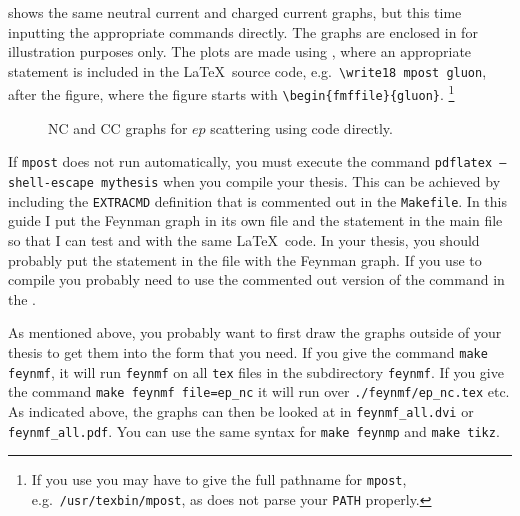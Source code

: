 shows the same neutral current and
charged current graphs, but this time inputting the appropriate
 commands directly. The graphs are enclosed in
 for illustration purposes only.
The plots are made using ,
where an appropriate
 statement is included in the \LaTeX\ source code,
e.g.\ \verb+\write18 mpost gluon+, after the figure, where the figure
starts with \verb+\begin{fmffile}{gluon}+.%
\footnote{If you use \TeXstudio you may have to give the full pathname for \texttt{mpost},
  e.g.\ \texttt{/usr/texbin/mpost}, as \TeXstudio does not parse your \texttt{PATH} properly.}

\begin{figure}[htbp]
  \centering
  \fbox{}
  \qquad
  \fbox{}
  \caption{NC and CC graphs for $ep$ scattering using 
    code directly.}%
  \label{fig:nccc-feynmf}
\end{figure}

If \texttt{mpost} does not run automatically,
you must execute the command
\texttt{pdflatex --shell-escape mythesis} when you compile your thesis.
This can be achieved by
including the \texttt{EXTRACMD} definition that is commented out in
the \texttt{Makefile}.
In this guide I put the Feynman graph in its
own file and the  statement in the main file so that
I can test  and  with the same
\LaTeX\ code. In your thesis, you should probably put the
 statement in the file with the Feynman graph.
If you use  to compile you probably need to use 
the commented out version of the  command in the .

As mentioned above, you probably want to first draw the graphs outside
of your thesis to get them into the form that you need. If you give
the command \texttt{make feynmf}, it will run \texttt{feynmf} on all
\texttt{tex} files in the subdirectory \texttt{feynmf}. If you give
the command \texttt{make feynmf file=ep\_nc} it will run over
\texttt{./feynmf/ep\_nc.tex} etc. As indicated above, the graphs can
then be looked at in \texttt{feynmf\_all.dvi} or\\
\texttt{feynmf\_all.pdf}. You can use the same syntax for
\texttt{make feynmp} and \texttt{make tikz}.



